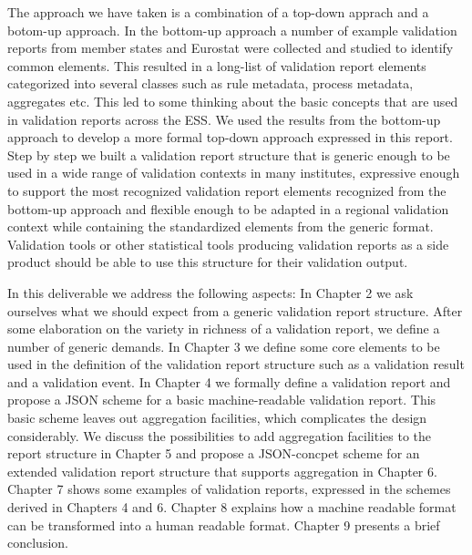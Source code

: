 The approach we have taken is a combination of a top-down apprach and a
botom-up approach.  In the bottom-up approach a number of example validation
reports from member states and Eurostat were collected and studied to identify
common elements.  This resulted in a long-list of validation report elements
categorized into several classes such as rule metadata, process metadata,
aggregates etc.  This led to some thinking about the basic concepts that are
used in validation reports across the ESS.  We used the results from the
bottom-up approach to develop a more formal top-down approach expressed in this
report.  Step by step we built a validation report structure that is generic
enough to be used in a wide range of validation contexts in many institutes,
expressive enough to support the most recognized validation report elements
recognized from the bottom-up approach and flexible enough to be adapted in a
regional validation context while containing the standardized elements from the
generic format.  Validation tools or other statistical tools producing
validation reports as a side product should be able to use this structure for
their validation output.

In this deliverable we address the following aspects: In Chapter 2 we ask
ourselves what we should expect from a generic validation report structure.
After some elaboration on the variety in richness of a validation report, we
define a number of generic demands.  In Chapter 3 we define some core elements
to be used in the definition of the validation report structure such as a
validation result and a validation event.  In Chapter 4 we formally define a
validation report and propose a JSON scheme for a basic machine-readable
validation report.  This basic scheme leaves out aggregation facilities, which
complicates the design considerably.  We discuss the possibilities to add
aggregation facilities to the report structure in Chapter 5 and propose a
JSON-concpet scheme for an extended validation report structure that supports
aggregation in Chapter 6.  Chapter 7 shows some examples of validation reports,
expressed in the schemes derived in Chapters 4 and 6.  Chapter 8 explains how a
machine readable format can be transformed into a human readable format.
Chapter 9 presents a brief conclusion.


